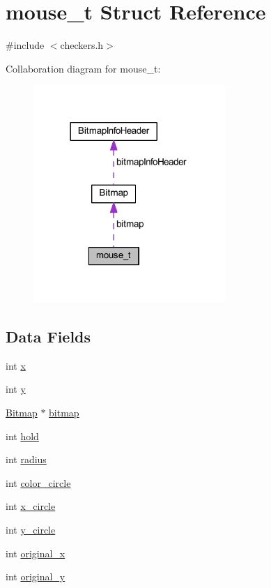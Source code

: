 \hypertarget{structmouse__t}{}\section{mouse\+\_\+t Struct Reference}
\label{structmouse__t}


{\ttfamily \#include $<$checkers.\+h$>$}



Collaboration diagram for mouse\+\_\+t\+:\nopagebreak
\begin{figure}[H]
\begin{center}
\leavevmode
\includegraphics[width=206pt]{structmouse__t__coll__graph}
\end{center}
\end{figure}
\subsection*{Data Fields}
\begin{DoxyCompactItemize}
\item 
int \hyperlink{structmouse__t_a6150e0515f7202e2fb518f7206ed97dc}{x}
\item 
int \hyperlink{structmouse__t_a0a2f84ed7838f07779ae24c5a9086d33}{y}
\item 
\hyperlink{struct_bitmap}{Bitmap} $\ast$ \hyperlink{structmouse__t_a00c870e2cedff0b231b1c8ad85019f66}{bitmap}
\item 
int \hyperlink{structmouse__t_a0c4545c1a96c0145f5a3c908f1df2b8a}{hold}
\item 
int \hyperlink{structmouse__t_a395279899207ce7f17adf9fdb8ee97ee}{radius}
\item 
int \hyperlink{structmouse__t_a1167d2ae386ab6d548a086185e16a43b}{color\+\_\+circle}
\item 
int \hyperlink{structmouse__t_af8ae0e3b70fa87729bedfdb24414857e}{x\+\_\+circle}
\item 
int \hyperlink{structmouse__t_ad7206eb221c616f2208152a59b62eb1d}{y\+\_\+circle}
\item 
int \hyperlink{structmouse__t_a4f08f62253e9d13c564b88256150c0dd}{original\+\_\+x}
\item 
int \hyperlink{structmouse__t_a9ae97019274f18be94e95d77c4adcf3d}{original\+\_\+y}
\end{DoxyCompactItemize}


